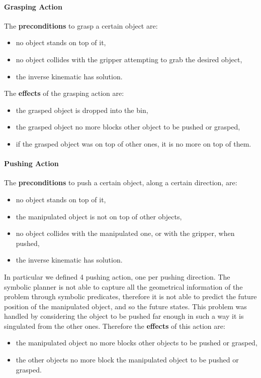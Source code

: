 
\paragraph{Grasping Action}
The \textbf{preconditions} to grasp a certain object are:
\begin{itemize}
\item no object stands on top of it,
\item no object collides with the gripper attempting to grab the desired object,
\item the inverse kinematic has solution.
\end{itemize}
The \textbf{effects} of the grasping action are:
\begin{itemize}
\item the grasped object is dropped into the bin,
\item the grasped object no more blocks other object to be pushed or grasped,
\item if the grasped object was on top of other ones, it is no more on top of them.
\end{itemize}  

\paragraph{Pushing Action}
The \textbf{preconditions} to push a certain object, along a certain direction, are:
\begin{itemize}
\item no object stands on top of it,
\item the manipulated object is not on top of other objects,
\item no object collides with the manipulated one, or with the gripper, when pushed,
\item the inverse kinematic has solution.
\end{itemize}
In particular we defined 4 pushing action, one per pushing direction. 
The symbolic planner is not able to capture all the geometrical information of the problem through symbolic predicates, therefore it is not able to predict the future position of the manipulated object, and so the future states. This problem was handled by considering the object to be pushed far enough in such a way it is singulated from the other ones.  
Therefore the \textbf{effects} of this action are:
\begin{itemize}
\item the manipulated object no more blocks other objects to be pushed or grasped,
\item the other objects no more block the manipulated object to be pushed or grasped.
\end{itemize}  

